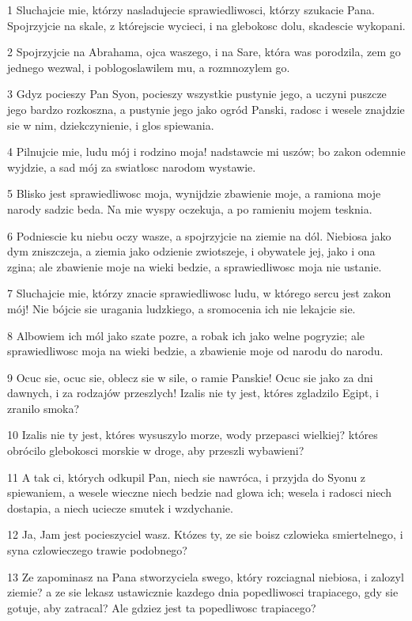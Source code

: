 \par 1 Sluchajcie mie, którzy nasladujecie sprawiedliwosci, którzy szukacie Pana. Spojrzyjcie na skale, z którejscie wycieci, i na glebokosc dolu, skadescie wykopani.
\par 2 Spojrzyjcie na Abrahama, ojca waszego, i na Sare, która was porodzila, zem go jednego wezwal, i poblogoslawilem mu, a rozmnozylem go.
\par 3 Gdyz pocieszy Pan Syon, pocieszy wszystkie pustynie jego, a uczyni puszcze jego bardzo rozkoszna, a pustynie jego jako ogród Panski, radosc i wesele znajdzie sie w nim, dziekczynienie, i glos spiewania.
\par 4 Pilnujcie mie, ludu mój i rodzino moja! nadstawcie mi uszów; bo zakon odemnie wyjdzie, a sad mój za swiatlosc narodom wystawie.
\par 5 Blisko jest sprawiedliwosc moja, wynijdzie zbawienie moje, a ramiona moje narody sadzic beda. Na mie wyspy oczekuja, a po ramieniu mojem tesknia.
\par 6 Podniescie ku niebu oczy wasze, a spojrzyjcie na ziemie na dól. Niebiosa jako dym zniszczeja, a ziemia jako odzienie zwiotszeje, i obywatele jej, jako i ona zgina; ale zbawienie moje na wieki bedzie, a sprawiedliwosc moja nie ustanie.
\par 7 Sluchajcie mie, którzy znacie sprawiedliwosc ludu, w którego sercu jest zakon mój! Nie bójcie sie uragania ludzkiego, a sromocenia ich nie lekajcie sie.
\par 8 Albowiem ich mól jako szate pozre, a robak ich jako welne pogryzie; ale sprawiedliwosc moja na wieki bedzie, a zbawienie moje od narodu do narodu.
\par 9 Ocuc sie, ocuc sie, oblecz sie w sile, o ramie Panskie! Ocuc sie jako za dni dawnych, i za rodzajów przeszlych! Izalis nie ty jest, któres zgladzilo Egipt, i zranilo smoka?
\par 10 Izalis nie ty jest, któres wysuszylo morze, wody przepasci wielkiej? któres obrócilo glebokosci morskie w droge, aby przeszli wybawieni?
\par 11 A tak ci, których odkupil Pan, niech sie nawróca, i przyjda do Syonu z spiewaniem, a wesele wieczne niech bedzie nad glowa ich; wesela i radosci niech dostapia, a niech uciecze smutek i wzdychanie.
\par 12 Ja, Jam jest pocieszyciel wasz. Któzes ty, ze sie boisz czlowieka smiertelnego, i syna czlowieczego trawie podobnego?
\par 13 Ze zapominasz na Pana stworzyciela swego, który rozciagnal niebiosa, i zalozyl ziemie? a ze sie lekasz ustawicznie kazdego dnia popedliwosci trapiacego, gdy sie gotuje, aby zatracal? Ale gdziez jest ta popedliwosc trapiacego?
